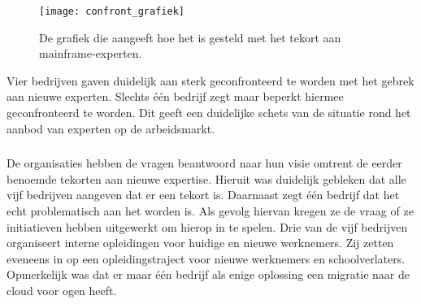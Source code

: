  \begin{figure}[h]
     \centering
     \texttt{[image: confront\_grafiek]}
     \caption{De grafiek die aangeeft hoe het is gesteld met het tekort aan mainframe-experten.}
 \end{figure}

Vier bedrijven gaven duidelijk aan sterk geconfronteerd te worden met het gebrek aan nieuwe experten. Slechts één bedrijf zegt maar beperkt hiermee geconfronteerd te worden. Dit geeft een duidelijke schets van de situatie rond het aanbod van experten op de arbeidsmarkt.

 \subsubsection{}
\label{sec:Wat is de visie van de bevraagde bedrijven rond expertise en welke initiatieve zetten ze hiervoor op?}

De organisaties hebben de vragen beantwoord naar hun visie omtrent de eerder benoemde tekorten aan nieuwe expertise. Hieruit was duidelijk gebleken dat alle vijf bedrijven aangeven dat er een tekort is. Daarnaast zegt één bedrijf dat het echt problematisch aan het worden is. Als gevolg hiervan kregen ze de vraag of ze initiatieven hebben uitgewerkt om hierop in te spelen. Drie van de vijf bedrijven organiseert interne opleidingen voor huidige en nieuwe werknemers. Zij zetten eveneens in op een opleidingstraject voor nieuwe werknemers en schoolverlaters. Opmerkelijk was dat er maar één bedrijf als enige oplossing een migratie naar de cloud voor ogen heeft. 

\newpage

\subsubsection{}
\label{sec:Welke nadelen brengt het gebruik van een mainframe mee voor de organisatie?}

